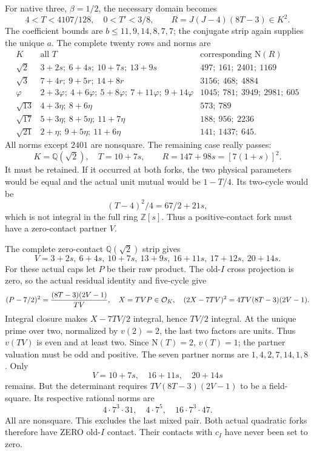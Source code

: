 \documentclass[11pt]{article}
\begin{document}
For native three, \(\beta=1/2\),
the necessary domain becomes
\[
 4<T<4107/128,\quad0<T'<3/8,\qquad
                         R=J(J-4)(8T-3)\in K^2 .
\]
The coefficient bounds are
\(b\le11,9,14,8,7,7\); the conjugate
strip again supplies the unique \(a\).
The complete twenty rows and norms are
\[
\begin{array}{c|l|l}
 K&\text{all }T&\text{corresponding }\mathrm N(R)\\ \hline
 \sqrt2&3+2s;\ 6+4s;\ 10+7s;\ 13+9s&497;\ 161;\ 2401;\ 1169\\
 \sqrt3&7+4r;\ 9+5r;\ 14+8r&3156;\ 468;\ 4884\\
 \varphi&2+3\varphi;\ 4+6\varphi;\ 5+8\varphi;\
             7+11\varphi;\ 9+14\varphi&1045;\ 781;\ 3949;\ 2981;\ 605\\
 \sqrt{13}&4+3\eta;\ 8+6\eta&573;\ 789\\
 \sqrt{17}&5+3\eta;\ 8+5\eta;\ 11+7\eta&188;\ 956;\ 2236\\
 \sqrt{21}&2+\eta;\ 9+5\eta;\ 11+6\eta&141;\ 1437;\ 645 .
\end{array}
\]
All norms except \(2401\) are
nonsquare.
The remaining case really passes:
\[
              K=\mathbb Q(\sqrt2),\quad T=10+7s,\qquad
                 R=147+98s=[7(1+s)]^2 .
\]
It must be retained.
If it occurred at both forks,
the two physical parameters would
be equal and the actual unit mutual
would be \(1-T/4\).
Its two-cycle would be
\[
                        (T-4)^2/4=67/2+21s,
\]
which is not integral in the full
ring \(\mathbb Z[s]\).
Thus a positive-contact fork must
have a zero-contact partner \(V\).

The complete zero-contact
\(\mathbb Q(\sqrt2)\) strip gives
\[
 V=3+2s,\ 6+4s,\ 10+7s,\ 13+9s,\
                        16+11s,\ 17+12s,\ 20+14s .
\]
For these actual caps let \(P\)
be their raw product.
The old-\(I\) cross projection is
zero, so the actual residual identity
and five-cycle give
\[
 (P-7/2)^2={(8T-3)(2V-1)\over TV},\quad
 X=TVP\in\mathcal O_K,\quad
                (2X-7TV)^2=4TV(8T-3)(2V-1).
\]
Integral closure makes
\(X-7TV/2\) integral, hence \(TV/2\)
integral.
At the unique prime over two,
normalized by \(v(2)=2\), the last
two factors are units.
Thus \(v(TV)\) is even and at least
two.
Since \(\mathrm N(T)=2\), \(v(T)=1\);
the partner valuation must be odd
and positive.
The seven partner norms are
\(1,4,2,7,14,1,8\).
Only
\[
                         V=10+7s,\quad16+11s,\quad20+14s
\]
remains.
But the determinant requires
\(TV(8T-3)(2V-1)\) to be a field-square.
Its respective rational norms are
\[
                           4\cdot7^3\cdot31,\quad
                           4\cdot7^5,\quad
                           16\cdot7^3\cdot47 .
\]
All are nonsquare.
This excludes the last mixed pair.
Both actual quadratic forks
therefore have ZERO old-\(I\) contact.
Their contacts with \(c_I\) have
never been set to zero.
\end{document}
